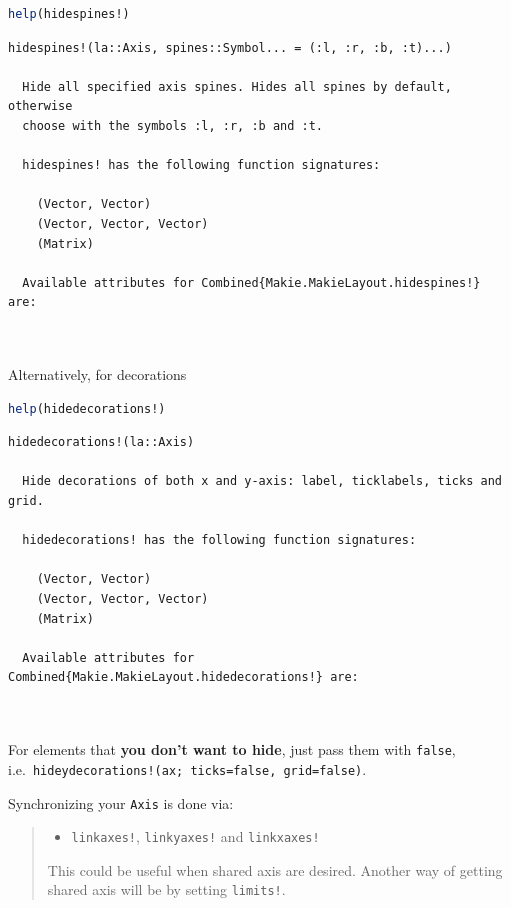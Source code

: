 \documentclass[
  notoc %
]{tufte-book}
\providecommand{\tightlist}{%
  \setlength{\itemsep}{0pt}\setlength{\parskip}{0pt}
}
\newcommand{\passthrough}[1]{#1}
\begin{document}
\begin{lstlisting}[language=Julia]
help(hidespines!)
\end{lstlisting}

\begin{lstlisting}[language=Output]
  hidespines!(la::Axis, spines::Symbol... = (:l, :r, :b, :t)...)

  Hide all specified axis spines. Hides all spines by default, otherwise
  choose with the symbols :l, :r, :b and :t.

  hidespines! has the following function signatures:

    (Vector, Vector)
    (Vector, Vector, Vector)
    (Matrix)

  Available attributes for Combined{Makie.MakieLayout.hidespines!} are:

  
\end{lstlisting}

Alternatively, for decorations

\begin{lstlisting}[language=Julia]
help(hidedecorations!)
\end{lstlisting}

\begin{lstlisting}[language=Output]
  hidedecorations!(la::Axis)

  Hide decorations of both x and y-axis: label, ticklabels, ticks and grid.

  hidedecorations! has the following function signatures:

    (Vector, Vector)
    (Vector, Vector, Vector)
    (Matrix)

  Available attributes for Combined{Makie.MakieLayout.hidedecorations!} are:

  
\end{lstlisting}

For elements that \textbf{you don't want to hide}, just pass them with
\passthrough{\lstinline!false!},
i.e.~\passthrough{\lstinline"hideydecorations!(ax; ticks=false, grid=false)"}.

Synchronizing your \passthrough{\lstinline!Axis!} is done via:

\begin{quote}
\begin{itemize}
\tightlist
\item
  \passthrough{\lstinline"linkaxes!"},
  \passthrough{\lstinline"linkyaxes!"} and
  \passthrough{\lstinline"linkxaxes!"}
\end{itemize}

This could be useful when shared axis are desired. Another way of
getting shared axis will be by setting
\passthrough{\lstinline"limits!"}.
\end{quote}
\end{document}
